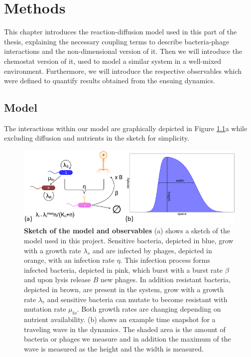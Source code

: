 \chapter{Methods}
\label{chap:phage_methods}

This chapter introduces the reaction-diffusion model used in this part of the thesis, explaining the necessary coupling terms to describe bacteria-phage interactions and the non-dimensional version of it. Then we will introduce the chemostat version of it, used to model a similar system in a well-mixed environment. Furthermore, we will introduce the respective observables which were defined to quantify results obtained from the ensuing dynamics.
\section{Model}
The interactions within our model are graphically depicted in Figure \ref{fig:model_sketch}a while excluding diffusion and nutrients in the sketch for simplicity.
\begin{figure}
\centering
\includegraphics[width=\linewidth]{graphics/2025_09_26_droplets_fig1.png}
\caption{\textbf{Sketch of the model and observables} (a) shows a sketch of the model used in this project. Sensitive bacteria, depicted in blue, grow with a growth rate $\lambda_s$ and are infected by phages, depicted in orange, with an infection rate $\eta$. This infection process forms infected bacteria, depicted in pink, which burst with a burst rate $\beta$ and upon lysis release $B$ new phages. In addition resistant bacteria, depicted in brown, are present in the system, grow with a growth rate $\lambda_r$ and sensitive bacteria can mutate to become resistant with mutation rate $\mu_{to}$. Both growth rates are changing depending on nutrient availability. (b) shows an example time snapshot for a traveling wave in the dynamics. The shaded area is the amount of bacteria or phages we measure and in addition the maximum of the wave is measured as the height and the width is measured.}
\label{fig:model_sketch}
\end{figure}
